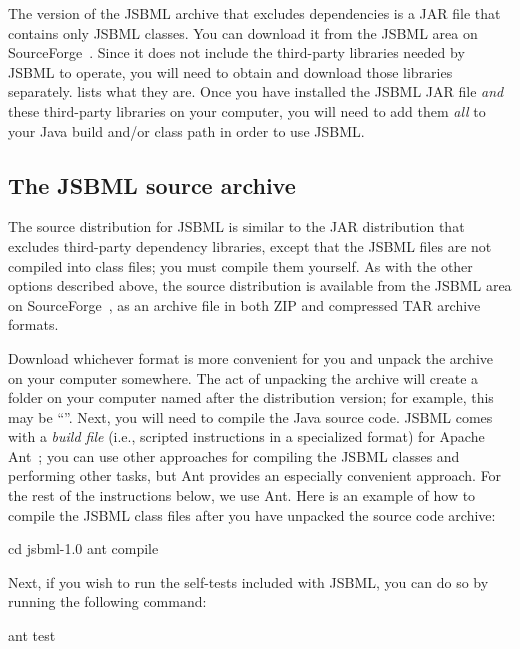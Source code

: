 The version of the JSBML archive that excludes dependencies is a JAR file
that contains only JSBML classes. You can download it from the JSBML area
on SourceForge~\cite{JSBMLdownload}. Since it does not include the
third-party libraries needed by JSBML to operate, you will need to obtain
and download those libraries separately.  lists
what they are. Once you have installed the JSBML JAR file \emph{and} these
third-party libraries on your computer, you will need to add them
\emph{all} to your Java build and/or class path in order to use JSBML.


\subsection{The JSBML source archive}
\label{sec:jsbml-source-archive}

The source distribution for JSBML is similar to the JAR distribution that
excludes third-party dependency libraries, except that the JSBML files are
not compiled into class files; you must compile them yourself. As with the
other options described above, the source distribution is available from
the JSBML area on SourceForge~\cite{JSBMLdownload}, as an archive file in
both ZIP and compressed TAR archive formats.

Download whichever format is more convenient for you and unpack the archive
on your computer somewhere.  The act of unpacking the archive will create a
folder on your computer named after the distribution version; for
example, this may be ``''.  Next, you will need to compile
the Java source code.  JSBML comes with a \emph{build file} (i.e., scripted
instructions in a specialized format) for Apache Ant~\citep{ApacheAnt};
you can use other approaches for compiling the JSBML classes and
performing other tasks, but Ant provides an especially convenient approach.
For the rest of the instructions below, we use Ant.  Here is an example of
how to compile the JSBML class files after you have unpacked the source
code archive:

\begin{example}[style=bash, title={Compiling JSBML with Ant; this example
    uses Bash shell syntax.}] 
cd jsbml-1.0
ant compile
\end{example}

Next, if you wish to run the self-tests included with JSBML, you can do so by
running the following command:

\begin{example}[style=bash, title={Running the unit tests provided with JSBML.}]
ant test
\end{example}

